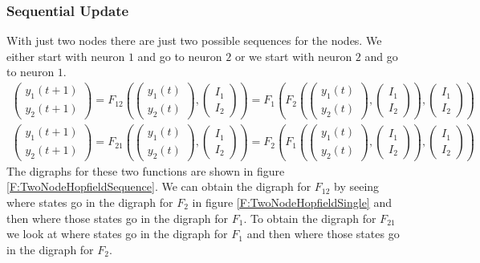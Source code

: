 \subsubsection{Sequential Update} 

  With just two nodes there are just two possible sequences for the nodes.
We either start with neuron $1$ and go to neuron $2$ or we start with neuron 
$2$ and go to neuron $1$.  
\begin{eqnarray*}
\begin{pmatrix}
y_1(t+1) \\ y_2(t+1)
\end{pmatrix}
= 
F_{12}
\left(
\begin{pmatrix}
y_1(t) \\ y_2(t)
\end{pmatrix},
\begin{pmatrix}
I_1 \\ I_2
\end{pmatrix}
\right)
=
F_1
\left(
F_2
\left(
\begin{pmatrix}
y_1(t) \\ y_2(t)
\end{pmatrix},
\begin{pmatrix}
I_1 \\ I_2
\end{pmatrix}
\right),
\begin{pmatrix}
I_1 \\ I_2
\end{pmatrix}
 \right) \\
\begin{pmatrix}
y_1(t+1) \\ y_2(t+1)
\end{pmatrix}
= 
F_{21}
\left(
\begin{pmatrix}
y_1(t) \\ y_2(t)
\end{pmatrix},
\begin{pmatrix}
I_1 \\ I_2
\end{pmatrix}
\right)
=
F_2
\left(
F_1
\left(
\begin{pmatrix}
y_1(t) \\ y_2(t)
\end{pmatrix},
\begin{pmatrix}
I_1 \\ I_2
\end{pmatrix}
\right),
\begin{pmatrix}
I_1 \\ I_2
\end{pmatrix}
 \right)
\end{eqnarray*}
The digraphs for these two functions are shown in figure  
\ref{F:TwoNodeHopfieldSequence}.  We can obtain the digraph for $F_{12}$ by
seeing where states go in the digraph for $F_2$ in figure 
\ref{F:TwoNodeHopfieldSingle} and then where those states go in the digraph for
$F_1$.  To obtain the digraph for $F_{21}$ we look at where states go in the
digraph for $F_1$ and then where those states go in the digraph for $F_2$.

